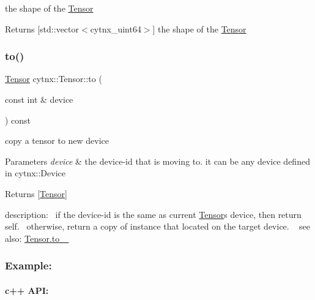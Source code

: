 the shape of the \hyperlink{classcytnx_1_1Tensor}{Tensor} 

\begin{DoxyReturn}{Returns}
\mbox{[}std\+::vector$<$cytnx\+\_\+uint64$>$\mbox{]} the shape of the \hyperlink{classcytnx_1_1Tensor}{Tensor} 
\end{DoxyReturn}
\mbox{\label{classcytnx_1_1Tensor_acf7f697a9434f9bc98a7d00a555ee982}} 
\subsubsection{\texorpdfstring{to()}{to()}}
{\footnotesize\ttfamily \hyperlink{classcytnx_1_1Tensor}{Tensor} cytnx\+::\+Tensor\+::to (\begin{DoxyParamCaption}\item[{const int \&}]{device }\end{DoxyParamCaption}) const\hspace{0.3cm}{\ttfamily [inline]}}



copy a tensor to new device 


\begin{DoxyParams}{Parameters}
{\em device} & the device-\/id that is moving to. it can be any device defined in cytnx\+::\+Device \\
\hline
\end{DoxyParams}
\begin{DoxyReturn}{Returns}
\mbox{[}\hyperlink{classcytnx_1_1Tensor}{Tensor}\mbox{]}
\end{DoxyReturn}
description\+:~\newline
 if the device-\/id is the same as current \hyperlink{classcytnx_1_1Tensor}{Tensor}\textquotesingle{}s device, then return self.~\newline
 otherwise, return a copy of instance that located on the target device. ~\newline
 see also\+: \hyperlink{classcytnx_1_1Tensor_a114a31fbb8bf4a90f150b6a67e42183a}{Tensor.\+to\+\_\+ } ~\newline
 \subsubsection*{Example\+:}

\paragraph*{c++ A\+PI\+:}


